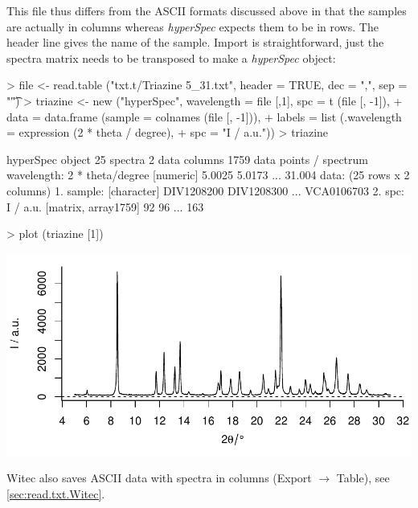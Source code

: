 \documentclass[english, a4paper, 10pt, headings=small, DIV11]{scrartcl}
\renewenvironment{Schunk}{\vspace{0pt}\begin{small}}{\end{small}\vspace{0pt}}
\newcommand{\Rclass}[1]{\texorpdfstring{\nohyphens{\textit{#1}}}{#1}}
\newcommand{\chy}{\Rclass{hyperSpec}\xspace}
\begin{document}
This file thus differs from the ASCII formats discussed above in that the samples are actually in
columns whereas \chy expects them to be in rows. The header line gives the name of the sample.
Import is straightforward, just the spectra matrix needs to be transposed to make a \chy object:
\begin{Schunk}
\begin{Sinput}
> file <- read.table ("txt.t/Triazine 5_31.txt", header = TRUE, dec = ",", sep = "\t")
> triazine <- new ("hyperSpec", wavelength = file [,1], spc = t (file [, -1]),
+                  data = data.frame (sample = colnames (file [, -1])),
+                  labels = list (.wavelength = expression (2 * theta / degree),
+                                spc = "I / a.u."))
> triazine
\end{Sinput}
\begin{Soutput}
hyperSpec object
   25 spectra
   2 data columns
   1759 data points / spectrum
wavelength: 2 * theta/degree [numeric] 5.0025 5.0173 ... 31.004 
data:  (25 rows x 2 columns)
   1. sample:  [character] DIV1208200 DIV1208300 ... VCA0106703 
   2. spc: I / a.u. [matrix, array1759] 92 96 ... 163 
\end{Soutput}
\end{Schunk}
\begin{Schunk}
\begin{Sinput}
> plot (triazine [1])
\end{Sinput}
\end{Schunk}
\includegraphics{fileio-fig--plot-triazine}

Witec also saves ASCII data with spectra in columns (Export $\rightarrow$ Table), see \ref{sec:read.txt.Witec}.
\end{document}

